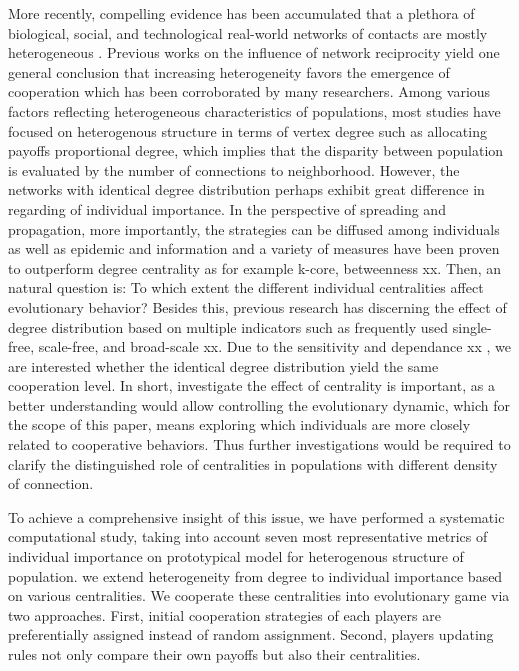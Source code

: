 \documentclass[preprint,12pt,3p]{elsarticle}
\begin{document}
    More recently, compelling evidence has been accumulated that a plethora of biological,
social, and technological real-world networks of contacts are mostly
heterogeneous \cite{AmaralScala-18284,DorogovtsevMendes-18285,AlbertBarabási-18286}.
Previous works on the influence of network reciprocity yield one general conclusion that
increasing heterogeneity favors the emergence of cooperation which has been corroborated
by many researchers\cite{SantosPacheco-18280}.
   Among various factors reflecting heterogeneous characteristics of populations,
most studies have focused on heterogenous structure in terms of vertex degree such as
allocating payoffs proportional degree\cite{SantosSantos-18293},
which implies that the disparity between population is evaluated by the number of connections to neighborhood.
However, the networks with identical degree distribution perhaps
exhibit great difference in regarding of individual importance.
In the perspective of spreading and propagation, more importantly, the strategies can be diffused among
individuals as well as epidemic and information and a variety of measures have been proven to outperform
degree centrality as for example k-core, betweenness xx.
Then, an natural question is: To which extent the different individual centralities affect evolutionary behavior?
    Besides this, previous research has discerning the effect of degree distribution based on multiple indicators
 such as frequently used single-free, scale-free, and broad-scale xx.
Due to the sensitivity and dependance xx , we are interested whether the identical degree distribution yield the same cooperation level.
    In short, investigate the effect of centrality is important,
as a better understanding would allow controlling the evolutionary dynamic,
which for the scope of this paper, means exploring which individuals are
more closely related to cooperative behaviors.
Thus further investigations would be required to clarify the distinguished role of centralities
in populations with different density of connection.

To achieve a comprehensive insight of this issue, we have performed a systematic computational
study, taking into account seven most representative metrics of individual importance on
prototypical model for heterogenous structure of population.
we extend heterogeneity from degree to individual importance based on various centralities.
We cooperate these centralities into evolutionary game via two approaches.
First, initial cooperation strategies of each players are preferentially assigned instead of random assignment.
Second, players updating rules not only compare their own payoffs but also their centralities.
\end{document}
